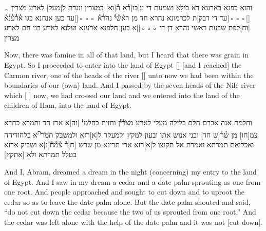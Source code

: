 
\begin{aramaictext}
    \dots
    \vacat
    והוא כפנא בארעא ד̇א כ̇ולא̇ ושמעת די ע[בו]ר֯א 
    ה֯[וא] במצרין ונגדת
    ל̇[מעל] לאר̇̇ע̇ מ̇צרין [\hspace*{1.5em}]◦◦◦[\hspace*{1.5em}עד די דבק]ת לכ̇רמונא נהרא חד מן 
    רא֯ש֯י֯ נה̇ר֯א֯ ◦◦◦[\hspace*{1.5em}]עד כען אנחנא בגו א֯ר֯ע֯נ֯א֯ [וח]לפת שבעת ראשי נהרא דן 
    די
    ◦◦◦[\hspace*{1.5em}]א כען חלפנא א̇ר̇ענא ועלנא לארע בני חם לארע מצרין
\end{aramaictext}

\begin{translation}
    Now, there was famine in all of that land, but I heard that there was grain in Egypt. So I proceeded 
    to enter into the land of Egypt [\hspace*{1em}] [and I reached] the Carmon river, one of 
    the heads of the river [\hspace*{1em}] unto now we had been within the boundaries of our (own) land. And I passed by the seven heads of the Nile river which [
    ] now, we had crossed our land and we entered into the land of the children of Ham, into the land of Egypt.
\end{translation}

\begin{aramaictext}
    \vacat
    וחלמת אנה אברם חלם בלילה מעלי לאר̇ע̇ מ̇צ̇ר֯י֯ן וחזית בחלמי֯ [וה]א 
    ארז חד ותמרא
    כחדא צמ[חו] מן ש֯ר֯[ש חד] ובני אנוש אתו ובעון למק̇ץ ולמ̇עקר ל[א]ר̇זא 
    ולמ̇ש̇ב̇ק̇ ת̇מ̇ר̇\textsuperscript{ת}א בלחודיהה
    ואכליאת תמרתא ואמרת אל תקוצ̇ו ל[א]רזא ארי תרינא מן שרש [ח]ד֯ 
    צ֯מ֯ח֯[נ]א ושביק ארזא בטלל תמרתא
    ולא [אתקץ] \vacat
\end{aramaictext}

\begin{translation}
    \vacat And I, Abram, dreamed a dream in the night (concerning) my entry to the land of Egypt.  And I saw in my dream a cedar and a date palm
    sprouting as one from one root. And people approached and sought to cut down and to uproot the cedar so as to leave the date palm alone.
    But the date palm shouted and said, ``do not cut down the cedar because the two of us sprouted from one root.'' And the cedar was left alone with the help of the date palm
    and it was not [cut down].
\end{translation}

